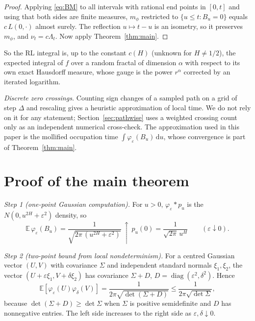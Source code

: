 \documentclass[11pt]{article}
\theoremstyle{remark}
\theoremstyle{definition}
\newcommand{\E}{\mathbb{E}}
\newcommand{\dd}{\,\mathrm{d}}
\begin{document}
\begin{proof}
Applying \eqref{eq:BM} to all intervals with rational end points in $[0,t]$ and using that both sides are finite measures, $m_\phi$ restricted to $\{u\le t:B_u=0\}$ equals $c\,L(0,\cdot)$ almost surely. The reflection $u\mapsto t-u$ is an isometry, so it preserves $m_\phi$, and $\nu_t=c\Lambda_t$. Now apply Theorem~\ref{thm:main}.
\end{proof}

So the RL integral is, up to the constant $c(H)$ (unknown for $H\neq1/2$), the expected integral of $f$ over a random fractal of dimension $\alpha$ with respect to its own exact Hausdorff measure, whose gauge is the power $r^\alpha$ corrected by an iterated logarithm.

\emph{Discrete zero crossings.} Counting sign changes of a sampled path on a grid of step $\Delta$ and rescaling gives a heuristic approximation of local time. We do not rely on it for any statement; Section~\ref{sec:pathwise} uses a weighted crossing count only as an independent numerical cross-check. The approximation used in this paper is the mollified occupation time $\int\varphi_\varepsilon(B_u)\dd u$, whose convergence is part of Theorem~\ref{thm:main}.

\section{Proof of the main theorem}\label{sec:proof}

\emph{Step 1 (one-point Gaussian computation).} For $u>0$, $\varphi_\varepsilon*p_u$ is the $N(0,u^{2H}+\varepsilon^2)$ density, so
\begin{equation}\label{eq:step1}
\E\,\varphi_\varepsilon(B_u)=\frac{1}{\sqrt{2\pi\,(u^{2H}+\varepsilon^2)}}\ \uparrow\ p_u(0)=\frac{1}{\sqrt{2\pi}\,u^{H}}\qquad(\varepsilon\downarrow0).
\end{equation}

\emph{Step 2 (two-point bound from local nondeterminism).} For a centred Gaussian vector $(U,V)$ with covariance $\Sigma$ and independent standard normals $\xi_1,\xi_2$, the vector $(U+\varepsilon\xi_1,V+\delta\xi_2)$ has covariance $\Sigma+D$, $D=\operatorname{diag}(\varepsilon^2,\delta^2)$. Hence
\begin{equation}\label{eq:step2}
\E[\varphi_\varepsilon(U)\varphi_\delta(V)]=\frac{1}{2\pi\sqrt{\det(\Sigma+D)}}\le\frac{1}{2\pi\sqrt{\det\Sigma}},
\end{equation}
because $\det(\Sigma+D)\ge\det\Sigma$ when $\Sigma$ is positive semidefinite and $D$ has nonnegative entries. The left side increases to the right side as $\varepsilon,\delta\downarrow0$.
\end{document}
